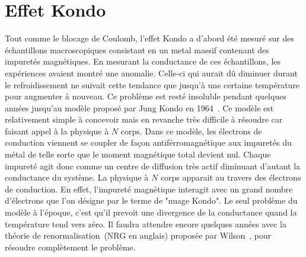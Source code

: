 

\section{Effet Kondo}

Tout comme le blocage de Coulomb, l'effet Kondo a d'abord été mesuré sur des échantillons macroscopiques consistant en un metal massif contenant des impuretés magnétiques. En mesurant la conductance de ces échantillons, les expériences avaient montré une anomalie. Celle-ci qui aurait d\^u diminuer durant le refroidissement ne suivait cette tendance que jusqu'à une certaine température pour augmenter à nouveau. Ce problème est resté insoluble pendant quelques années jusqu'au modèle proposé par Jung Kondo en 1964~\cite{JKondo1}. Ce modèle est relativement simple à concevoir mais en revanche très difficile à résoudre car faisant appel à la physique à $N$ corps. Dans ce modèle, les électrons de conduction viennent se coupler de façon antiférromagnétique aux impuretés du métal de telle sorte que le moment magnétique total devient nul. Chaque impureté agit donc comme un centre de diffusion très actif diminuant d'autant la conductance du système. La physique à $N$ corps apparait au travers des électrons de conduction. En effet, l'impureté magnétique interagit avec un grand nombre d'électrons que l'on désigne par le terme de "nuage Kondo". Le seul problème du modèle à l'époque, c'est qu'il prevoit une divergence de la conductance quand la température tend vers zéro. Il faudra attendre encore quelques années avec la théorie de renormalisation~(NRG en anglais) proposée par Wilson~\cite{Wilson1975}, pour résoudre complètement le problème.

